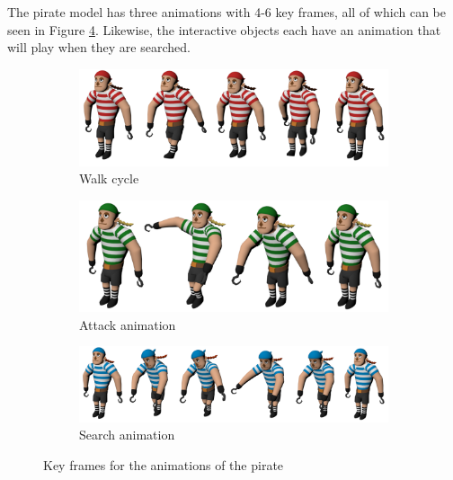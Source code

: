 The pirate model has three animations with 4-6 key frames, all of which can be seen in Figure \ref{fig:key_frames}. Likewise, the interactive objects each have an animation that will play when they are searched.

\begin{figure}[h!]
	\centering
	\begin{subfigure}[b]{\textwidth}
		\centering
		\includegraphics[scale=0.25]{figures/walk_cycle.png}
		\caption{Walk cycle}
		\label{fig:walk_cycle}
	\end{subfigure}
	
	\begin{subfigure}[b]{\textwidth}
		\centering
		\includegraphics[scale=0.25]{figures/attack_anim.png}
		\caption{Attack animation}
		\label{fig:attack_anim}
	\end{subfigure}
	
	\begin{subfigure}[b]{\textwidth}
		\centering
		\includegraphics[scale=0.25]{figures/search_anim.png}
		\caption{Search animation}
		\label{fig:search_anim}
	\end{subfigure}
	\caption{Key frames for the animations of the pirate}
	\label{fig:key_frames}
\end{figure}


